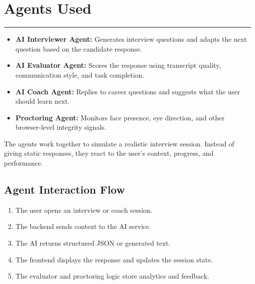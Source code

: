 ﻿\documentclass[12pt,a4paper]{article}
\newcommand{\sectionline}{\vspace{0.4em}\hrule\vspace{0.8em}}
\begin{document}
\clearpage

\section{Agents Used}
\sectionline
\begin{itemize}
  \item \textbf{AI Interviewer Agent:} Generates interview questions and adapts the next question based on the candidate response.
  \item \textbf{AI Evaluator Agent:} Scores the response using transcript quality, communication style, and task completion.
  \item \textbf{AI Coach Agent:} Replies to career questions and suggests what the user should learn next.
  \item \textbf{Proctoring Agent:} Monitors face presence, eye direction, and other browser-level integrity signals.
\end{itemize}

The agents work together to simulate a realistic interview session. Instead of giving static responses, they react to the user's context, progress, and performance.

\subsection{Agent Interaction Flow}
\begin{enumerate}
  \item The user opens an interview or coach session.
  \item The backend sends context to the AI service.
  \item The AI returns structured JSON or generated text.
  \item The frontend displays the response and updates the session state.
  \item The evaluator and proctoring logic store analytics and feedback.
\end{enumerate}

\clearpage
\end{document}
